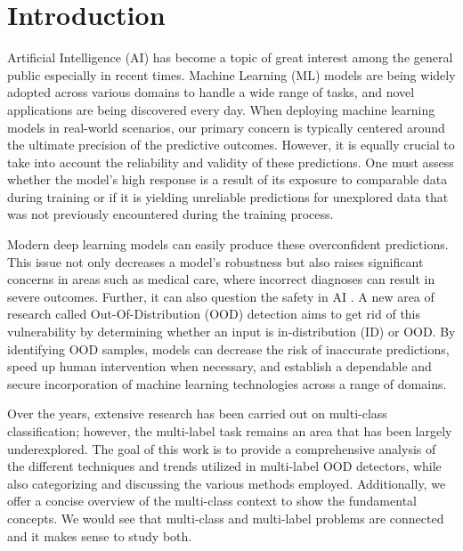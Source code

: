 \section{Introduction}

Artificial Intelligence (AI) has become a topic of great interest among the general public especially in recent times. 
Machine Learning (ML) models are being widely adopted across various domains to handle a wide range of tasks, 
and novel applications are being discovered every day. When deploying machine learning models in real-world scenarios, 
our primary concern is typically centered around the ultimate precision of the predictive outcomes. 
However, it is equally crucial to take into account the reliability and validity of these predictions. 
One must assess whether the model's high response is a result of its exposure to comparable data during training or if it is yielding 
unreliable predictions for unexplored data that was not previously encountered during the training process.

Modern deep learning models can easily produce these overconfident predictions. 
This issue not only decreases a model's robustness but also raises significant concerns in areas such as medical care, where incorrect diagnoses can result in severe outcomes. 
Further, it can also question the safety in AI \cite{Amodei2016}.
A new area of research called Out-Of-Distribution (OOD) detection aims to get rid of this vulnerability by determining whether an input is in-distribution (ID) or OOD. \cite{Hendrycks2016} \cite{Wang2021} \cite{Mohseni2021} \cite{Zolfi2022} \cite{Yang2021} \cite{Huang2021}
By identifying OOD samples, models can decrease the risk of inaccurate predictions, speed up human intervention when necessary, and establish a dependable and secure incorporation of machine learning technologies across a range of domains.

Over the years, extensive research has been carried out on multi-class classification; 
however, the multi-label task remains an area that has been largely underexplored. 
The goal of this work is to provide a comprehensive analysis of the different techniques and trends 
utilized in multi-label OOD detectors, while also categorizing and discussing the various methods employed. 
Additionally, we offer a concise overview of the multi-class context to show the fundamental concepts. 
We would see that multi-class and multi-label problems are connected and it makes sense to study both.


